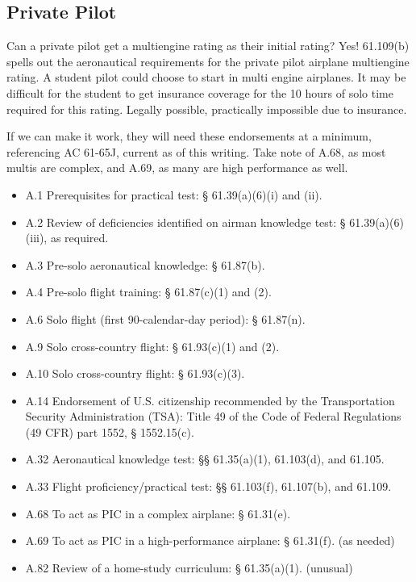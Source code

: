 \subsection{Private Pilot}

Can a private pilot get a multiengine rating as their initial rating?
Yes! 61.109(b) spells out the aeronautical requirements
for the private pilot airplane multiengine rating. A student pilot could choose to start in multi
engine airplanes. It may be difficult for the student to get insurance coverage for the 10 hours
of solo time required for this rating. Legally possible, practically impossible due to insurance.

If we can make it work, they will need these endorsements at a minimum, referencing AC 61-65J, current as of this writing. Take note of A.68, as most multis are complex, and A.69, as many are high performance as well.

\begin{itemize}
\item A.1 Prerequisites for practical test: § 61.39(a)(6)(i) and (ii).
\item A.2 Review of deficiencies identified on airman knowledge test: § 61.39(a)(6)(iii), as
required.
\item A.3 Pre-solo aeronautical knowledge: § 61.87(b).
\item A.4 Pre-solo flight training: § 61.87(c)(1) and (2).
\item A.6 Solo flight (first 90-calendar-day period): § 61.87(n).
\item A.9 Solo cross-country flight: § 61.93(c)(1) and (2).
\item A.10 Solo cross-country flight: § 61.93(c)(3).
\item A.14 Endorsement of U.S. citizenship recommended by the Transportation Security
Administration (TSA): Title 49 of the Code of Federal Regulations (49 CFR)
part 1552, § 1552.15(c).
\item A.32 Aeronautical knowledge test: §§ 61.35(a)(1), 61.103(d), and 61.105.
\item A.33 Flight proficiency/practical test: §§ 61.103(f), 61.107(b), and 61.109.
\item A.68 To act as PIC in a complex airplane: § 61.31(e).
\item A.69 To act as PIC in a high-performance airplane: § 61.31(f). (as needed)
\item A.82 Review of a home-study curriculum: § 61.35(a)(1). (unusual)
\end{itemize}

